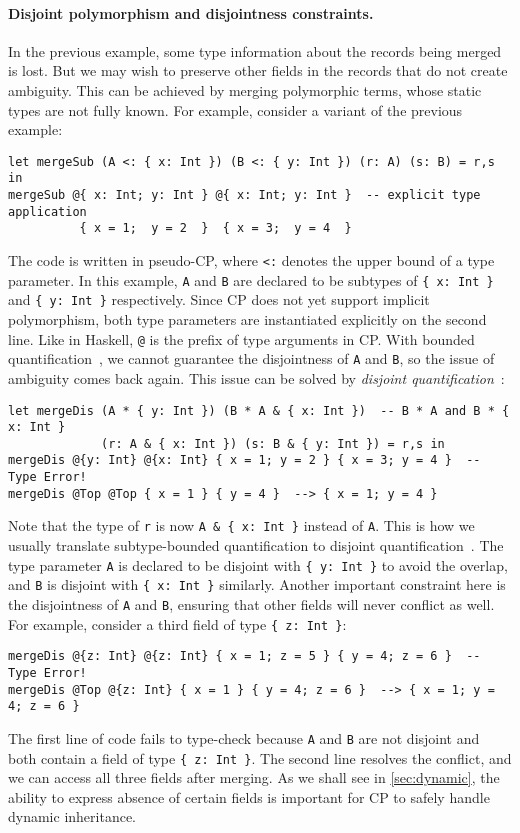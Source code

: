 \paragraph{Disjoint polymorphism and disjointness constraints.}
In the previous example, some type information about the records being merged is
lost. But we may wish to preserve other fields in the records that do not create
ambiguity. This can be achieved by merging polymorphic terms, whose static types
are not fully known. For example, consider a variant of the previous example:
\begin{lstlisting}
let mergeSub (A <: { x: Int }) (B <: { y: Int }) (r: A) (s: B) = r,s in
mergeSub @{ x: Int; y: Int } @{ x: Int; y: Int }  -- explicit type application
          { x = 1;  y = 2  }  { x = 3;  y = 4  }
\end{lstlisting}
The code is written in pseudo-CP, where \lstinline{<:} denotes the upper bound
of a type parameter. In this example, \lstinline{A} and \lstinline{B} are
declared to be subtypes of \lstinline|{ x: Int }| and \lstinline|{ y: Int }|
respectively. Since CP does not yet support implicit polymorphism, both type
parameters are instantiated explicitly on the second line. Like in Haskell,
\lstinline|@| is the prefix of type arguments in CP. With bounded
quantification~\citep{cardelli1985understanding}, we cannot guarantee the
disjointness of \lstinline{A} and \lstinline{B}, so the issue of ambiguity comes
back again. This issue can be solved by \emph{disjoint
quantification}~\citep{alpuim2017disjoint}:
\begin{lstlisting}
let mergeDis (A * { y: Int }) (B * A & { x: Int })  -- B * A and B * { x: Int }
             (r: A & { x: Int }) (s: B & { y: Int }) = r,s in
mergeDis @{y: Int} @{x: Int} { x = 1; y = 2 } { x = 3; y = 4 }  -- Type Error!
mergeDis @Top @Top { x = 1 } { y = 4 }  --> { x = 1; y = 4 }
\end{lstlisting}
Note that the type of \lstinline{r} is now \lstinline|A & { x: Int }| instead of
\lstinline{A}. This is how we usually translate subtype-bounded quantification
to disjoint quantification~\citep{xie2020row}. The type parameter \lstinline{A}
is declared to be disjoint with \lstinline|{ y: Int }| to avoid the overlap, and
\lstinline{B} is disjoint with \lstinline|{ x: Int }| similarly. Another
important constraint here is the disjointness of \lstinline{A} and
\lstinline{B}, ensuring that other fields will never conflict as well. For
example, consider a third field of type \lstinline|{ z: Int }|:
\begin{lstlisting}
mergeDis @{z: Int} @{z: Int} { x = 1; z = 5 } { y = 4; z = 6 }  -- Type Error!
mergeDis @Top @{z: Int} { x = 1 } { y = 4; z = 6 }  --> { x = 1; y = 4; z = 6 }
\end{lstlisting}
The first line of code fails to type-check because \lstinline{A} and
\lstinline{B} are not disjoint and both contain a field of type
\lstinline|{ z: Int }|. The second line resolves the conflict, and we can access
all three fields after merging. As we shall see in \autoref{sec:dynamic}, the
ability to express absence of certain fields is important for CP to safely
handle dynamic inheritance.

